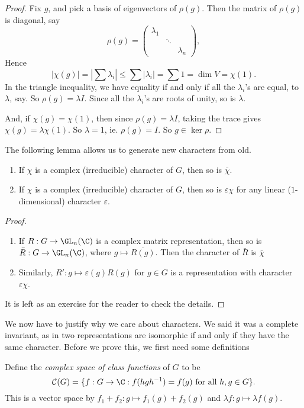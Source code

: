 \documentclass[a4paper]{article}
\begin{document}
\begin{proof}
  Fix $g$, and pick a basis of eigenvectors of $\rho(g)$. Then the matrix of $\rho(g)$ is diagonal, say
  \[
    \rho(g) =
    \begin{pmatrix}
      \lambda_1\\
      & \ddots\\
      && \lambda_n
    \end{pmatrix},
  \]
  Hence
  \[
    |\chi(g)| = \left|\sum \lambda_i\right| \leq \sum |\lambda_i| = \sum 1 = \dim V = \chi(1).
  \]
  In the triangle inequality, we have equality if and only if all the $\lambda_i$'s are equal, to $\lambda$, say. So $\rho(g) = \lambda I$. Since all the $\lambda_i$'s are roots of unity, so is $\lambda$.

  And, if $\chi(g) = \chi(1)$, then since $\rho(g) = \lambda I$, taking the trace gives $\chi(g) = \lambda \chi(1)$. So $\lambda = 1$, ie. $\rho(g) = I$. So $g \in \ker \rho$.
\end{proof}

The following lemma allows us to generate new characters from old.
\begin{lemma}\leavevmode
  \begin{enumerate}
    \item If $\chi$ is a complex (irreducible) character of $G$, then so is $\bar{\chi}$.
    \item If $\chi$ is a complex (irreducible) character of $G$, then so is $\varepsilon \chi$ for any linear ($1$-dimensional) character $\varepsilon$.
  \end{enumerate}
\end{lemma}

\begin{proof}\leavevmode
  \begin{enumerate}
    \item If $R: G \to \GL_n(\C)$ is a complex matrix representation, then so is $\bar{R}: G \to \GL_n(\C)$, where $g \mapsto \overline{R(g)}$. Then the character of $\bar{R}$ is $\bar{\chi}$
    \item Similarly, $R': g \mapsto \varepsilon(g) R(g)$ for $g \in G$ is a representation with character $\varepsilon \chi$.
  \end{enumerate}
  It is left as an exercise for the reader to check the details.
\end{proof}

We now have to justify why we care about characters. We said it was a complete invariant, as in two representations are isomorphic if and only if they have the same character. Before we prove this, we first need some definitions
\begin{defi}
  Define the \emph{complex space of class functions} of $G$ to be
  \[
    \mathcal{C}(G) = \{f: G \to \C: f(hgh^{-1}) = f(g)\text{ for all }h, g \in G\}.
  \]
  This is a vector space by $f_1 + f_2 : g \mapsto f_1(g) + f_2(g)$ and $\lambda f: g \mapsto \lambda f(g)$.
\end{defi}
\end{document}
